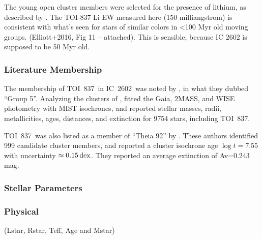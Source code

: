 \documentclass[12pt,twocolumn,tighten]{aastex63}
\newcommand{\tn}{TOI~837} %
\newcommand{\cn}{IC~2602} %
\begin{document}
The young open cluster members were selected for the presence of
lithium, as described by \citet{randich_gaiaeso_2018}.
The TOI-837 Li EW measured here (150 milliangstrom) is consistent
with what's seen for stars of similar colors in <100 Myr old moving
groups.
(Elliott+2016, Fig 11 -- attached).  This is sensible, because
IC 2602 is supposed to be 50 Myr old.



\subsubsection{Literature Membership}
The membership of \tn\ in \cn\ was noted by \citet{oh_comoving_2017},
in what they dubbed ``Group 5''.
Analyzing the clusters of \citet{oh_comoving_2017},
\citet{bochanski_fundamental_2018} fitted the Gaia, 2MASS, and
WISE photometry with MIST isochrones, and reported stellar masses,
radii, metallicities, ages, distances, and extinction for 9754 stars,
including \tn.
%


\tn\ was also listed as a member of ``Theia 92'' by
\citet{kounkel_untangling_2019}.
These authors identified 999 candidate cluster members, and
reported a cluster isochrone age $\log t = 7.55$ with uncertainty
$\approx 0.15\,{\rm dex}$.
They reported an average extinction of Av=0.243 mag.


\subsubsection{Stellar Parameters}



\subsubsection{Physical}
 (Lstar, Rstar, Teff, Age and Mstar)
\end{document}
